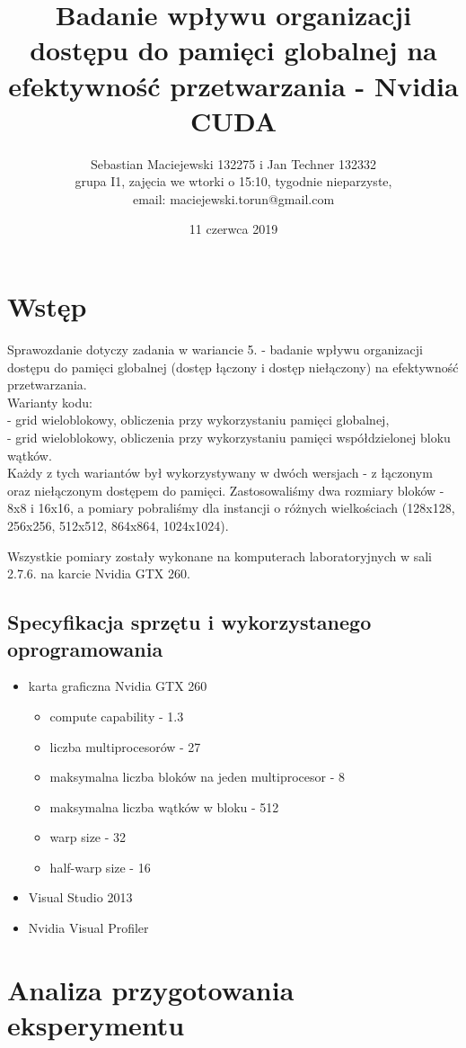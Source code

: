 \documentclass[10pt,a4paper]{article}
\author{Sebastian Maciejewski 132275 i Jan Techner 132332\\
grupa I1, zajęcia we wtorki o 15:10, tygodnie nieparzyste,\\
email: maciejewski.torun@gmail.com}
\title{Badanie wpływu organizacji dostępu do pamięci globalnej na efektywność
przetwarzania - Nvidia CUDA}
\date{11 czerwca 2019}
\begin{document}
\maketitle
\section{Wstęp}
Sprawozdanie dotyczy zadania w wariancie 5. - badanie wpływu organizacji dostępu do
pamięci globalnej (dostęp łączony i dostęp niełączony) na efektywność przetwarzania.\\
Warianty kodu:\\
- grid wieloblokowy, obliczenia przy wykorzystaniu pamięci globalnej,\\
- grid wieloblokowy, obliczenia przy wykorzystaniu pamięci współdzielonej bloku wątków.\\
Każdy z tych wariantów był wykorzystywany w dwóch wersjach - z łączonym oraz niełączonym
dostępem do pamięci. Zastosowaliśmy dwa rozmiary bloków - 8x8 i 16x16, a pomiary pobraliśmy
dla instancji o różnych wielkościach (128x128, 256x256, 512x512, 864x864, 1024x1024).

Wszystkie pomiary zostały wykonane na komputerach laboratoryjnych w sali 2.7.6. na karcie
Nvidia GTX 260.

\subsection{Specyfikacja sprzętu i wykorzystanego oprogramowania}
\begin{itemize}
	\item karta graficzna Nvidia GTX 260
	      \begin{itemize}
	      	\item compute capability - 1.3
	      	\item liczba multiprocesorów - 27
	      	\item maksymalna liczba bloków na jeden multiprocesor - 8
	      	\item maksymalna liczba wątków w bloku - 512
	      	\item warp size - 32
	      	\item half-warp size - 16
	      \end{itemize}
	\item Visual Studio 2013
	\item Nvidia Visual Profiler
\end{itemize}

\newpage 

\section{Analiza przygotowania eksperymentu}
\end{document}
